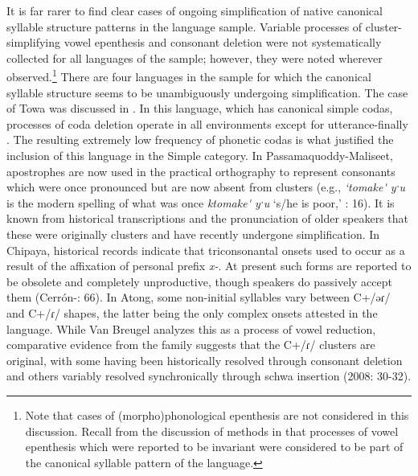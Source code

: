   It is far rarer to find clear cases of ongoing simplification of native canonical syllable structure patterns in the language sample. Variable processes of cluster-simplifying vowel epenthesis and consonant deletion were not systematically collected for all languages of the sample; however, they were noted wherever observed.\footnote{{Note that cases of (morpho)phonological epenthesis are not considered in this discussion. Recall from the discussion of methods in  that processes of vowel epenthesis which were reported to be invariant were considered to be part of the canonical syllable pattern of the language.}} There are four languages in the sample for which the canonical syllable structure seems to be unambiguously undergoing simplification. The case of Towa was discussed in . In this language, which has canonical simple codas, processes of coda deletion operate in all environments except for utterance-finally \citep[22-4]{Yumitani1998}. The resulting extremely low frequency of phonetic codas is what justified the inclusion of this language in the Simple category. In Passamaquoddy-Maliseet, apostrophes are now used in the practical orthography to represent consonants which were once pronounced but are now absent from clusters (e.g., \textit{‘tomake\'{} yˑu} is the modern spelling of what was once \textit{ktomake\'{} yˑu} ‘s/he is poor,’ \citealt{Leavitt1996}: 16). It is known from historical transcriptions and the pronunciation of older speakers that these were originally clusters and have recently undergone simplification. In Chipaya, historical records indicate that triconsonantal onsets used to occur as a result of the affixation of personal prefix \textit{x-}. At present such forms are reported to be obsolete and completely unproductive, though speakers do passively accept them (Cerrón-\citealt{Palomino2006}: 66). In Atong, some non-initial syllables vary between C+/əɾ/ and C+/ɾ/ shapes, the latter being the only complex onsets attested in the language. While Van Breugel analyzes this as a process of vowel reduction, comparative evidence from the family suggests that the C+/ɾ/ clusters are original, with some having been historically resolved through consonant deletion and others variably resolved synchronically through schwa insertion (2008: 30-32).

